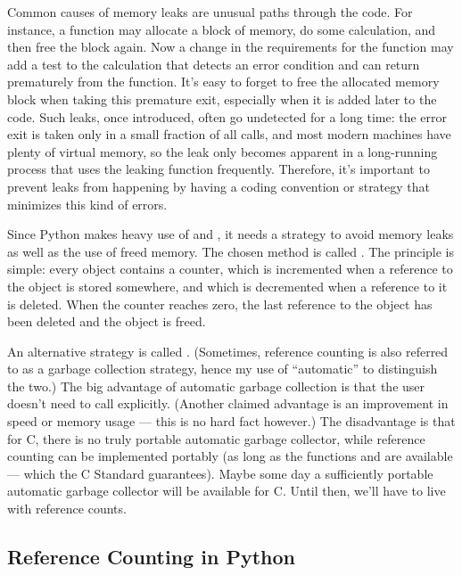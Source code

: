 \documentclass{manual}
\begin{document}
Common causes of memory leaks are unusual paths through the code.  For
instance, a function may allocate a block of memory, do some
calculation, and then free the block again.  Now a change in the
requirements for the function may add a test to the calculation that
detects an error condition and can return prematurely from the
function.  It's easy to forget to free the allocated memory block when
taking this premature exit, especially when it is added later to the
code.  Such leaks, once introduced, often go undetected for a long
time: the error exit is taken only in a small fraction of all calls,
and most modern machines have plenty of virtual memory, so the leak
only becomes apparent in a long-running process that uses the leaking
function frequently.  Therefore, it's important to prevent leaks from
happening by having a coding convention or strategy that minimizes
this kind of errors.

Since Python makes heavy use of  and
, it needs a strategy to avoid memory leaks as well
as the use of freed memory.  The chosen method is called
.  The principle is simple: every object
contains a counter, which is incremented when a reference to the
object is stored somewhere, and which is decremented when a reference
to it is deleted.  When the counter reaches zero, the last reference
to the object has been deleted and the object is freed.

An alternative strategy is called .
(Sometimes, reference counting is also referred to as a garbage
collection strategy, hence my use of ``automatic'' to distinguish the
two.)  The big advantage of automatic garbage collection is that the
user doesn't need to call  explicitly.  (Another claimed
advantage is an improvement in speed or memory usage --- this is no
hard fact however.)  The disadvantage is that for C, there is no
truly portable automatic garbage collector, while reference counting
can be implemented portably (as long as the functions 
and  are available --- which the C Standard guarantees).
Maybe some day a sufficiently portable automatic garbage collector
will be available for C.  Until then, we'll have to live with
reference counts.

\subsection{Reference Counting in Python
            \label{refcountsInPython}}
\end{document}
